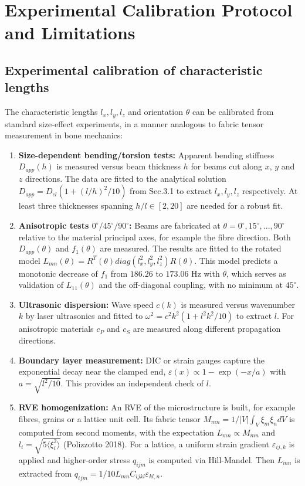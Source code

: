 \documentclass[final,3p,times,fleqn]{elsarticle}
\newcommand{\rev}[1]{\textcolor{revcolor}{#1}}
\begin{document}
\section{Experimental Calibration Protocol and Limitations}
\label{sec:calibration}

\subsection{Experimental calibration of characteristic lengths}
\label{sec:exp_calib}
\rev{The characteristic lengths $l_x,l_y,l_z$ and orientation $\theta$ can be calibrated from standard size-effect experiments, in a manner analogous to fabric tensor measurement in bone mechanics:}

\begin{enumerate}
  \item \rev{\textbf{Size-dependent bending/torsion tests:} Apparent bending stiffness $D_{app}(h)$ is measured versus beam thickness $h$ for beams cut along $x$, $y$ and $z$ directions. The data are fitted to the analytical solution $D_{app}=D_{cl}(1+ (l/h)^2/10)$ from Sec.3.1 to extract $l_x,l_y,l_z$ respectively. At least three thicknesses spanning $h/l\in[2,20]$ are needed for a robust fit.}
  \item \rev{\textbf{Anisotropic tests $0^\circ/45^\circ/90^\circ$:} Beams are fabricated at $\theta=0^\circ,15^\circ,...,90^\circ$ relative to the material principal axes, for example the fibre direction. Both $D_{app}(\theta)$ and $f_1(\theta)$ are measured. The results are fitted to the rotated model $L_{mn}(\theta)=R^T(\theta)diag(l_x^2,l_y^2,l_z^2)R(\theta)$. This model predicts a monotonic decrease of $f_1$ from $186.26$ to $173.06$ Hz with $\theta$, which serves as validation of $L_{11}(\theta)$ and the off-diagonal coupling, with no minimum at $45^\circ$.}
  \item \rev{\textbf{Ultrasonic dispersion:} Wave speed $c(k)$ is measured versus wavenumber $k$ by laser ultrasonics and fitted to $\omega^2=c^2k^2(1+l^2k^2/10)$ to extract $l$. For anisotropic materials $c_P$ and $c_S$ are measured along different propagation directions.}
  \item \rev{\textbf{Boundary layer measurement:} DIC or strain gauges capture the exponential decay near the clamped end, $\varepsilon(x)\propto 1-\exp(-x/a)$ with $a=\sqrt{l^2/10}$. This provides an independent check of $l$.}
  \item \rev{\textbf{RVE homogenization:} An RVE of the microstructure is built, for example fibres, grains or a lattice unit cell. Its fabric tensor $M_{mn}=1/|V|\int_V \xi_m\xi_n dV$ is computed from second moments, with the expectation $L_{mn}\propto M_{mn}$ and $l_i=\sqrt{5\langle\xi_i^2\rangle}$ (Polizzotto 2018). For a lattice, a uniform strain gradient $\varepsilon_{ij,k}$ is applied and higher-order stress $q_{ijm}$ is computed via Hill-Mandel. Then $L_{mn}$ is extracted from $q_{ijm}=1/10 L_{mn} C_{ijkl}\varepsilon_{kl,n}$.}

\end{enumerate}
\end{document}
